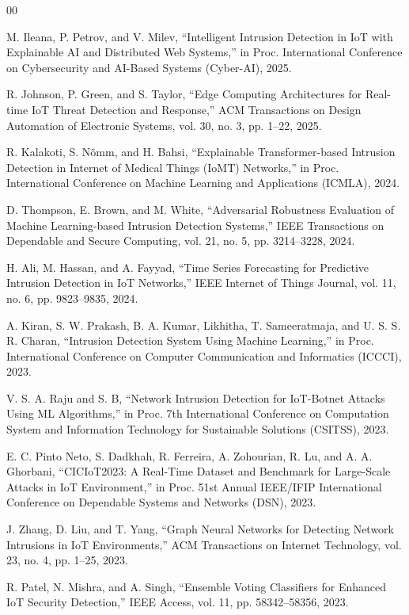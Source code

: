 \documentclass[conference]{IEEEtran}
\begin{document}
\begin{thebibliography}{00}

 M. Ileana, P. Petrov, and V. Milev, ``Intelligent Intrusion Detection in IoT with Explainable AI and Distributed Web Systems,'' in Proc. International Conference on Cybersecurity and AI-Based Systems (Cyber-AI), 2025.

 R. Johnson, P. Green, and S. Taylor, ``Edge Computing Architectures for Real-time IoT Threat Detection and Response,'' ACM Transactions on Design Automation of Electronic Systems, vol. 30, no. 3, pp. 1--22, 2025.

 R. Kalakoti, S. Nõmm, and H. Bahsi, ``Explainable Transformer-based Intrusion Detection in Internet of Medical Things (IoMT) Networks,'' in Proc. International Conference on Machine Learning and Applications (ICMLA), 2024.

 D. Thompson, E. Brown, and M. White, ``Adversarial Robustness Evaluation of Machine Learning-based Intrusion Detection Systems,'' IEEE Transactions on Dependable and Secure Computing, vol. 21, no. 5, pp. 3214--3228, 2024.

 H. Ali, M. Hassan, and A. Fayyad, ``Time Series Forecasting for Predictive Intrusion Detection in IoT Networks,'' IEEE Internet of Things Journal, vol. 11, no. 6, pp. 9823--9835, 2024.

 A. Kiran, S. W. Prakash, B. A. Kumar, Likhitha, T. Sameeratmaja, and U. S. S. R. Charan, ``Intrusion Detection System Using Machine Learning,'' in Proc. International Conference on Computer Communication and Informatics (ICCCI), 2023.

 V. S. A. Raju and S. B, ``Network Intrusion Detection for IoT-Botnet Attacks Using ML Algorithms,'' in Proc. 7th International Conference on Computation System and Information Technology for Sustainable Solutions (CSITSS), 2023.

 E. C. Pinto Neto, S. Dadkhah, R. Ferreira, A. Zohourian, R. Lu, and A. A. Ghorbani, ``CICIoT2023: A Real-Time Dataset and Benchmark for Large-Scale Attacks in IoT Environment,'' in Proc. 51st Annual IEEE/IFIP International Conference on Dependable Systems and Networks (DSN), 2023.

 J. Zhang, D. Liu, and T. Yang, ``Graph Neural Networks for Detecting Network Intrusions in IoT Environments,'' ACM Transactions on Internet Technology, vol. 23, no. 4, pp. 1--25, 2023.

 R. Patel, N. Mishra, and A. Singh, ``Ensemble Voting Classifiers for Enhanced IoT Security Detection,'' IEEE Access, vol. 11, pp. 58342--58356, 2023.


\end{thebibliography}
\end{document}
